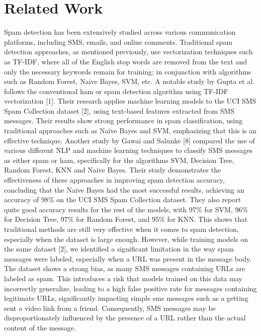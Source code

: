 \documentclass{article}
\begin{document}
\section{Related Work}
Spam detection has been extensively studied across various communication platforms, including SMS, emails, and online comments. Traditional spam detection approaches, as mentioned previously, use vectorization techniques such as TF-IDF, where all of the English stop words are removed from the text and only the necessary keywords remain for training; in conjunction with algorithms such as Random Forest, Naive Bayes, SVM, etc.
\newline
\newline
A notable study by Gupta et al. follows the conventional ham or spam detection algorithm using TF-IDF vectorization [1]. Their research applies machine learning models to the UCI SMS Spam Collection dataset [2], using text-based features extracted from SMS messages. Their results show strong performance in spam classification, using traditional approaches such as Naïve Bayes and SVM, emphasizing that this is an effective technique.
\newline
\newline
Another study by Gawai and Salunke [8] compared the use of various different NLP and machine learning techniques to classify SMS messages as either spam or ham, specifically for the algorithms SVM, Decision Tree, Random Forest, KNN and Naive Bayes. Their study demonstrates the effectiveness of these approaches in improving spam detection accuracy, concluding that the Naive Bayes had the most successful results, achieving an accuracy of 98\% on the UCI SMS Spam Collection dataset. They also report quite good accuracy results for the rest of the models, with 97\% for SVM, 96\% for Decision Tree, 97\% for Random Forest, and 95\% for KNN. This shows that traditional methods are still very effective when it comes to spam detection, especially when the dataset is large enough.
\newline
\newline
However, while training models on the same dataset [2], we identified a significant limitation in the way spam messages were labeled, especially when a URL was present in the message body. The dataset shows a strong bias, as many SMS messages containing URLs are labeled as spam. This introduces a risk that models trained on this data may incorrectly generalize, leading to a high false positive rate for messages containing legitimate URLs, significantly impacting simple sms messages such as a getting sent a video link from a friend. Consequently, SMS messages may be disproportionately influenced by the presence of a URL rather than the actual content of the message.
\end{document}
